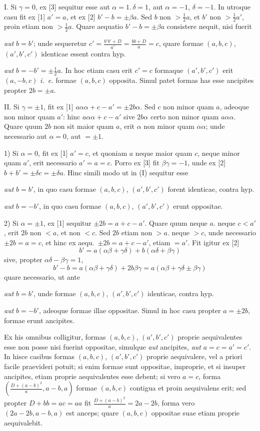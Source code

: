 I. Si $\gamma=0$, ex [3] sequitur esse aut $\alpha=1.\,\delta=1$, aut $\alpha=-1$, $\delta=-1$.
In utroque casu fit ex [1] $a'=a$, et ex [2] $b'-b=\pm\beta a$. Sed $b$ non $>\frac12 a$, et $b'$ non $>\frac12 a'$, proin etiam non $>\frac12 a$. Quare aequatio $b'-b=\pm\beta a$ consistere nequit, nisi fuerit

\emph{aut} $b=b'$; unde sequeretur $c'=\frac{b'b'+D}{a'}=\frac{bb+D}{a}=c$, quare formae $(a,b,c)$, $(a',b',c')$ identicae essent contra hyp.

\emph{aut} $b=-b'=\pm\frac12 a$. In hoc etiam casu erit $c'=c$ formaque $(a',b',c')$ erit $(a,-b,c)$ \emph{i.\ e.} formae $(a,b,c)$ opposita. Simul patet formas has esse ancipites propter $2b=\pm a$.

II. Si $\gamma=\pm1$, fit ex [1] $a\alpha\alpha+c-a'=\pm2b\alpha$. Sed $c$ non minor quam $a$, adeoque non minor quam $a'$: hinc $a\alpha\alpha+c-a'$ sive $2b\alpha$ certo non minor quam $a\alpha\alpha$. Quare quum $2b$ non sit maior quam $a$, erit $\alpha$ non minor quam $\alpha\alpha$; unde necessario aut $\alpha=0$, aut $=\pm1$.

1) Si $\alpha=0$, fit ex [1] $a'=c$, et quoniam $a$ neque maior quam $c$, neque minor quam $a'$, erit necessario $a'=a=c$. Porro ex [3] fit $\beta\gamma=-1$, unde ex [2] $b+b'=\pm\delta c=\pm\delta a$. Hinc simili modo ut in (I) sequitur esse

\emph{aut} $b=b'$, in quo casu formae $(a,b,c)$, $(a',b',c')$ forent identicae, contra hyp.

\emph{aut} $b=-b'$, in quo casu formae $(a,b,c)$, $(a',b',c')$ erunt oppositae.

2) Si $\alpha=\pm1$, ex [1] sequitur $\pm2b=a+c-a'$. Quare quum neque $a$. neque $c<a'$, erit $2b$ non $<a$, et non $<c$. Sed $2b$ etiam non $>a$. neque $>c$, unde necessario $\pm2b=a=c$, et hinc ex aequ.\ $\pm2b=a+c-a'$, etiam $=a'$. Fit igitur ex [2]
\[
b'=a(\alpha\beta+\gamma\delta)+b(\alpha\delta+\beta\gamma)
\]
sive, propter $\alpha\delta-\beta\gamma=1$,
\[
b'-b=a(\alpha\beta+\gamma\delta)+2b\beta\gamma=a(\alpha\beta+\gamma\delta\pm\beta\gamma)
\]
quare necessario, ut ante

\emph{aut} $b=b'$, unde formae $(a,b,c)$, $(a',b',c')$ identicae, contra hyp.

\emph{aut} $b=-b'$, adeoque formae illae oppositae. Simul in hoc casu propter $a=\pm2b$, formae erunt ancipites.

Ex his omnibus colligitur, formas $(a,b,c)$, $(a',b',c')$ proprie aequivalentes esse non posse nisi fuerint oppositae, simulque \emph{aut} ancipites, \emph{aut} $a=c=a'=c'$.
In hisce casibus formas $(a,b,c)$, $(a',b',c')$ proprie aequivalere, vel a priori facile praevideri potuit; si enim formae sunt oppositae, improprie, et si insuper ancipites, etiam proprie aequivalentes esse debent; si vero $a=c$, forma $(\frac{D+(a-b)^2}{a},a-b,a)$ formae $(a,b,c)$ contigua et proin aequivalens erit; sed propter $D+bb=ac=aa$ fit $\frac{D+(a-b)^2}{a}=2a-2b$, forma vero $(2a-2b,a-b,a)$ est anceps; quare $(a,b,c)$ oppositae suae etiam proprie aequivalebit.

